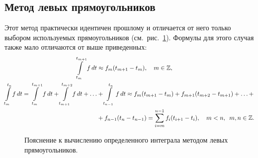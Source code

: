 \documentclass[12pt,a4paper,openany]{extarticle}
\begin{document}
\subsection{Метод левых прямоугольников}
\hspace*{\parindent}Этот метод практически идентичен прошлому и отличается от него только выбором используемых прямоугольников (см.~рис.~\ref{fig:left_rect_method}).
Формулы для этого случая также мало отличаются от выше приведенных:
\begin{align}
\int\limits_{t_m}^{t_{m+1}} f\,dt &\approx f_{m}(t_{m+1}-t_m), \quad m\in\mathbb{Z},\\
\int\limits_{t_m}^{t_{n}} f\,dt = \int\limits_{t_m}^{t_{m+1}} f\,dt + \int\limits_{t_{m+1}}^{t_{m+2}} f\,dt + \ldots &+ \int\limits_{t_{n-1}}^{t_{n}} f\,dt \approx f_{m}(t_{m+1}-t_m) + f_{m+1}(t_{m+2}-t_{m+1}) + \ldots + \notag\\
&+ f_{n-1}(t_{n}-t_{n-1}) = \sum\limits_{i=m}^{n-1}f_i(t_{i+1}-t_{i}), \quad m<n, \;\: m,n\in\mathbb{Z}\ldotp
\end{align}

\begin{figure}[p]
	\caption{Пояснение к вычислению определенного интеграла методом левых прямоугольников.}
	\label{fig:left_rect_method}
\end{figure}
\end{document}
